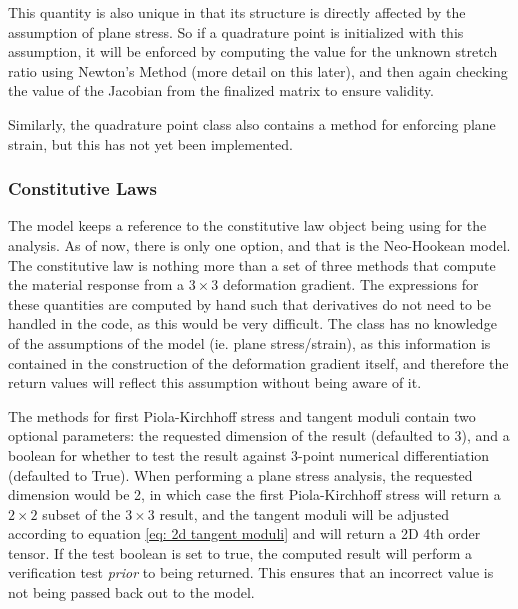 \documentclass[]{spie}  %
\begin{document}
This quantity is also unique in that its structure is directly affected by the assumption of plane stress. So if a quadrature point is initialized with this assumption, it will be enforced by computing the value for the unknown stretch ratio using Newton's Method (more detail on this later), and then again checking the value of the Jacobian from the finalized matrix to ensure validity.

Similarly, the quadrature point class also contains a method for enforcing plane strain, but this has not yet been implemented. 

\subsubsection{Constitutive Laws}
The model keeps a reference to the constitutive law object being using for the analysis. As of now, there is only one option, and that is the Neo-Hookean model. The constitutive law is nothing more than a set of three methods that compute the material response from a $3 \times 3$ deformation gradient. The expressions for these quantities are computed by hand such that derivatives do not need to be handled in the code, as this would be very difficult. The class has no knowledge of the assumptions of the model (ie. plane stress/strain), as this information is contained in the construction of the deformation gradient itself, and therefore the return values will reflect this assumption without being aware of it. 

The methods for first Piola-Kirchhoff stress and tangent moduli contain two optional parameters: the requested dimension of the result (defaulted to 3), and a boolean for whether to test the result against 3-point numerical differentiation (defaulted to True). When performing a plane stress analysis, the requested dimension would be 2, in which case the first Piola-Kirchhoff stress will return a $2 \times 2$ subset of the $3 \times 3$ result, and the tangent moduli will be adjusted according to equation \ref{eq: 2d tangent moduli} and will return a 2D 4th order tensor. If the test boolean is set to true, the computed result will perform a verification test \textit{prior} to being returned. This ensures that an incorrect value is not being passed back out to the model. 
\end{document}
